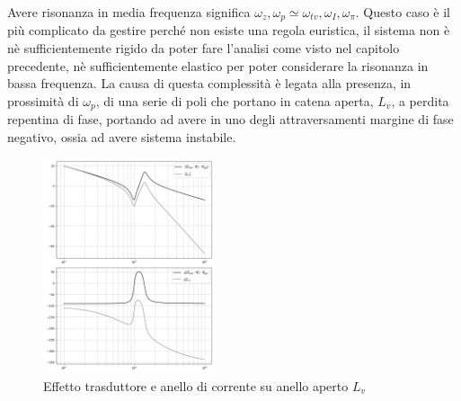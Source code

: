 Avere risonanza in media frequenza significa \(\omega_z,\omega_p \simeq \omega_{tv},\omega_I,\omega_\pi\). Questo caso è il più complicato da gestire perché non esiste una regola euristica, il sistema non è nè sufficientemente rigido da poter fare l'analisi come visto nel capitolo precedente, nè sufficientemente elastico per poter considerare la risonanza in bassa frequenza.
La causa di questa complessità è legata alla presenza, in prossimità di \(\omega_p\), di una serie di poli che portano in catena aperta, \(L_v\), a perdita repentina di fase, portando ad avere in uno degli attraversamenti margine di fase negativo, ossia ad avere sistema instabile.

\begin{figure}[h]
    \centering
    \includegraphics[width=0.45\textwidth]{Immagini/risonanza_media_f_Gvm_vs_Lv.png}
    \caption{Effetto trasduttore e anello di corrente su anello aperto \(L_v\)}
\end{figure}

